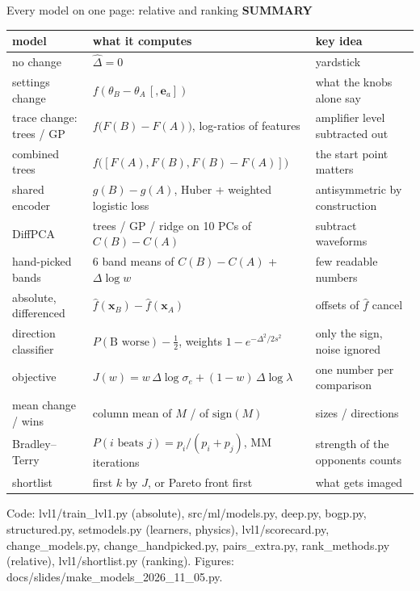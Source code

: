 \documentclass[aspectratio=169,11pt]{beamer}
\newcommand{\eyebrow}[2][trace]{{\color{#1}\scriptsize\bfseries\MakeUppercase{#2}}\par\vspace{0.1em}}
\newcommand{\Dl}{\Delta}
\newcommand{\se}{\sigma_e}
\newcommand{\xo}{\mathbf{x}}
\begin{document}
\begin{frame}{Every model on one page: relative and ranking}
\eyebrow{Summary}
\centering\scriptsize\renewcommand{\arraystretch}{1.0}
\begin{tabular}{@{}p{2.8cm}p{6.0cm}p{4.6cm}@{}}\toprule
model & what it computes & key idea\\\midrule
no change & $\hat\Dl=0$ & yardstick\\
settings change & $f(\theta_B-\theta_A\,[,\mathbf e_a])$ & what the knobs alone say\\
trace change: trees / GP & $f\big(F(B)-F(A)\big)$, log-ratios of features & amplifier level subtracted out\\
combined trees & $f\big([F(A),F(B),F(B)-F(A)]\big)$ & the start point matters\\
shared encoder & $g(B)-g(A)$, Huber + weighted logistic loss & antisymmetric by construction\\
DiffPCA & trees / GP / ridge on 10 PCs of $C(B)-C(A)$ & subtract waveforms\\
hand-picked bands & 6 band means of $C(B)-C(A)$ + $\Dl\log w$ & few readable numbers\\
absolute, differenced & $\hat f(\xo_B)-\hat f(\xo_A)$ & offsets of $\hat f$ cancel\\
direction classifier & $P(\text{B worse})-\tfrac12$, weights $1-e^{-\Dl^2/2s^2}$ & only the sign, noise ignored\\\midrule
objective & $J(w)=w\,\Dl\log\se+(1-w)\,\Dl\log\lambda$ & one number per comparison\\
mean change / wins & column mean of $M$ / of $\mathrm{sign}(M)$ & sizes / directions\\
Bradley--Terry & $P(i\text{ beats }j)=p_i/(p_i+p_j)$, MM iterations & strength of the opponents counts\\
shortlist & first $k$ by $J$, or Pareto front first & what gets imaged\\\bottomrule
\end{tabular}
\vspace{0.4em}
{\tiny\sloppy Code: lvl1/train\_lvl1.py (absolute), src/ml/models.py, deep.py, bogp.py, structured.py, setmodels.py (learners, physics), lvl1/scorecard.py, change\_models.py, change\_handpicked.py, pairs\_extra.py, rank\_methods.py (relative), lvl1/shortlist.py (ranking). Figures: docs/slides/make\_models\_2026\_11\_05.py.\par}
\end{frame}
\end{document}
